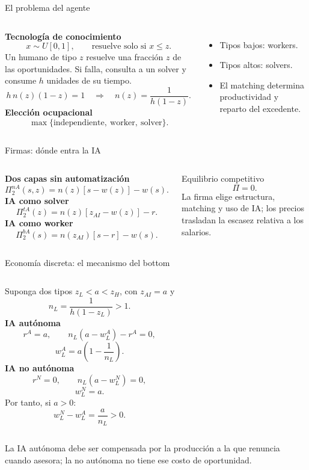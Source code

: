 \documentclass[aspectratio=169,11pt]{beamer}
\newcommand{\clave}[1]{\textcolor{Petroleo}{\textbf{#1}}}
\begin{document}
\begin{frame}{El problema del agente}
\begin{columns}[T,onlytextwidth]
\clave{Tecnolog\'ia de conocimiento}
\[x\sim U[0,1],\qquad \text{resuelve solo si }x\le z.\]
Un humano de tipo $z$ resuelve una fracci\'on $z$ de las oportunidades. Si falla, consulta a un solver y consume $h$ unidades de su tiempo.
\[h\,n(z)(1-z)=1\quad\Longrightarrow\quad\boxed{n(z)=\frac{1}{h(1-z)}}.\]
\clave{Elecci\'on ocupacional}
\[\max\{\text{independiente},\ \text{worker},\ \text{solver}\}.\]
\begin{itemize}\small
\item Tipos bajos: workers.
\item Tipos altos: solvers.
\item El matching determina productividad y reparto del excedente.
\end{itemize}
\end{columns}
\end{frame}

\begin{frame}{Firmas: d\'onde entra la IA}
\begin{columns}[T,onlytextwidth]
\clave{Dos capas sin automatizaci\'on}
\[\Pi_2^{nA}(s,z)=n(z)[s-w(z)]-w(s).\]
\clave{IA como solver}
\[\Pi_2^{tA}(z)=n(z)[z_{AI}-w(z)]-r.\]
\clave{IA como worker}
\[\Pi_2^{bA}(s)=n(z_{AI})[s-r]-w(s).\]
\begin{block}{Equilibrio competitivo}
\[\Pi=0.\]
La firma elige estructura, matching y uso de IA; los precios trasladan la escasez relativa a los salarios.
\end{block}
\end{columns}
\end{frame}

\begin{frame}{Econom\'ia discreta: el mecanismo del bottom}
\begin{columns}[T,onlytextwidth]
Suponga dos tipos $z_L<a<z_H$, con $z_{AI}=a$ y
\[n_L=\frac{1}{h(1-z_L)}>1.\]
\clave{IA aut\'onoma}
\[r^A=a,\qquad n_L(a-w_L^A)-r^A=0,\]
\[\boxed{w_L^A=a\left(1-\frac1{n_L}\right)}.\]
\clave{IA no aut\'onoma}
\[r^N=0,\qquad n_L(a-w_L^N)=0,\]
\[\boxed{w_L^N=a}.\]
Por tanto, si $a>0$:
\[\boxed{w_L^N-w_L^A=\frac{a}{n_L}>0}.\]
\end{columns}
{\small\color{Gris}La IA aut\'onoma debe ser compensada por la producci\'on a la que renuncia cuando asesora; la no aut\'onoma no tiene ese costo de oportunidad.}
\end{frame}
\end{document}
